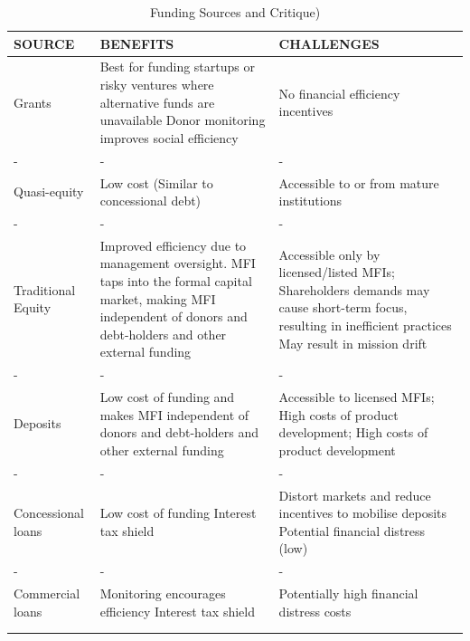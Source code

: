 \documentclass[a4paper, nobind]{templates/ociamthesis}
\begin{document}
\begin{landscape}

\begin{table}

\caption{\label{tab:unnamed-chunk-11}Funding Sources and Critique)}
\centering
\fontsize{8}{10}\selectfont
\begin{tabu} to 
\toprule
SOURCE & BENEFITS & CHALLENGES\\
\midrule
Grants & Best for funding startups or risky ventures where alternative funds are unavailable
Donor monitoring improves social efficiency & No financial efficiency incentives\\
- & - & -\\
Quasi-equity & Low cost (Similar to concessional debt) & Accessible to or from mature institutions\\
- & - & -\\
Traditional Equity & Improved efficiency due to management oversight.
MFI taps into the formal capital market, making MFI independent of donors and debt-holders and other external funding & Accessible only by licensed/listed MFIs; Shareholders demands may cause short-term focus, resulting in inefficient practices
May result in mission drift\\
\addlinespace
- & - & -\\
Deposits & Low cost of funding and makes MFI independent of donors and debt-holders and other external funding & Accessible to licensed MFIs;  High costs of product development;  
High costs of product development\\
- & - & -\\
Concessional loans & Low cost of funding
Interest tax shield & Distort markets and reduce incentives to mobilise deposits
Potential financial distress (low)\\
- & - & -\\
\addlinespace
Commercial loans & Monitoring encourages efficiency
Interest tax shield & Potentially high financial distress costs\\
\bottomrule
{}\\
\\
\end{tabu}
\end{table}

\end{landscape}
\end{document}
